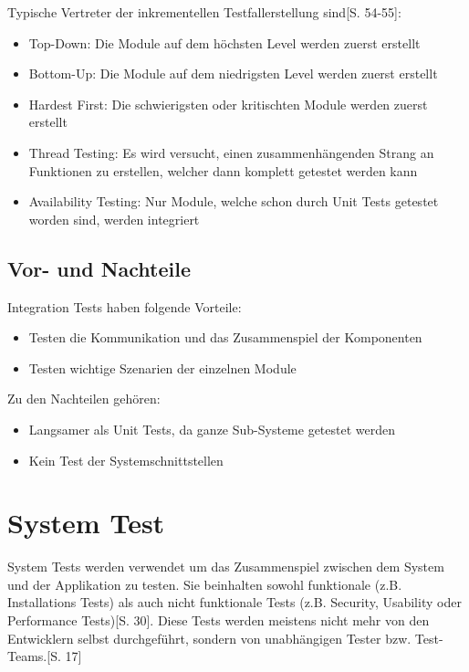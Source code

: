\documentclass[a4paper,bibtotoc,oneside]{scrbook}
\begin{document}
Typische Vertreter der inkrementellen Testfallerstellung sind\cite{test_large_systems}[S. 54-55]:

\begin{itemize}
  \item Top-Down: Die Module auf dem höchsten Level werden zuerst erstellt
  \item Bottom-Up: Die Module auf dem niedrigsten Level werden zuerst erstellt
  \item Hardest First: Die schwierigsten oder kritischten Module werden zuerst erstellt
  \item Thread Testing: Es wird versucht, einen zusammenhängenden Strang an Funktionen zu erstellen, welcher dann komplett getestet werden kann
  \item Availability Testing: Nur Module, welche schon durch Unit Tests getestet worden sind, werden integriert
\end{itemize}

\section{Vor- und Nachteile}
Integration Tests haben folgende Vorteile:

\begin{itemize}
  \item Testen die Kommunikation und das Zusammenspiel der Komponenten
  \item Testen wichtige Szenarien der einzelnen Module
\end{itemize}

Zu den Nachteilen gehören:

\begin{itemize}
  \item Langsamer als Unit Tests, da ganze Sub-Systeme getestet werden
  \item Kein Test der Systemschnittstellen
\end{itemize}


\chapter{System Test}
System Tests werden verwendet um das Zusammenspiel zwischen dem System und der Applikation zu testen. Sie beinhalten sowohl funktionale (z.B. Installations Tests) als auch nicht funktionale Tests (z.B. Security, Usability oder Performance Tests)\cite{betrieb}[S. 30]. Diese Tests \glqq werden meistens nicht mehr von den Entwicklern selbst durchgeführt, sondern von unabhängigen Tester bzw. Test-Teams.\grqq\cite{eval_regression}[S. 17]
\end{document}

